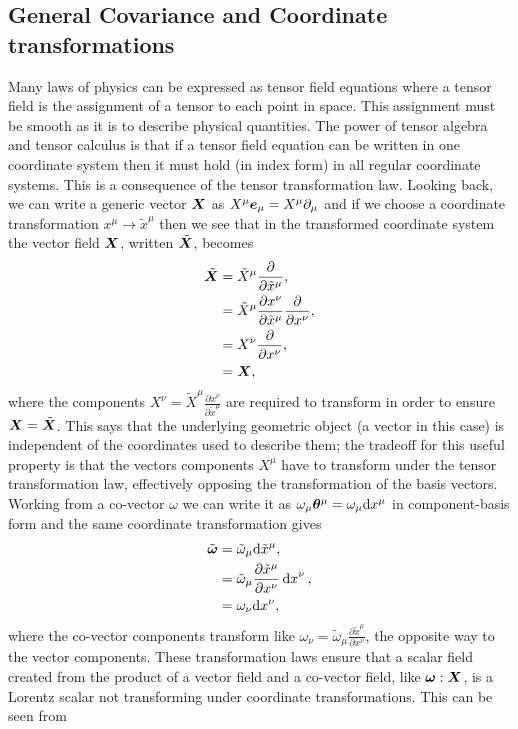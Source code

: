 \subsection{General Covariance and Coordinate transformations}\label{intro:sec:cov}
Many laws of physics can be expressed as tensor field equations where a tensor field is the assignment of a tensor to each point in space. This assignment must be smooth as it is to describe physical quantities. The power of tensor algebra and tensor calculus is that if a tensor field equation can be written in one coordinate system then  it must hold (in index form) in all regular coordinate systems. This is a consequence of the tensor transformation law. Looking back, we can write a generic vector $\boldsymbol{X}$ as $X^\mu \boldsymbol{e}_\mu = X^\mu \partial_\mu$ and if we choose a coordinate transformation $x^\mu \rightarrow \tilde{x}^\mu$ then we see that in the transformed coordinate system the vector field $\boldsymbol{X}$, written $\tilde{\boldsymbol{X}}$, becomes
\begin{align}
\tilde{\boldsymbol X} &= \tilde{X}^\mu\frac{\partial}{\partial \tilde{x}^\mu}, \\
              &= \tilde{X}^\mu\frac{\partial x^\nu}{\partial \tilde{x}^\mu}\frac{\partial}{\partial {x}^\nu}, \\
              &= X^\nu \frac{\partial}{\partial x^\nu}, \\
              &= \boldsymbol{X}, \
\end{align}
where the components $X^\nu = \tilde{X}^\mu\frac{\partial x^\nu}{\partial \tilde{x}^\mu}$ are required to transform in order to ensure $\boldsymbol{X}=\tilde{\boldsymbol{X}}$. This says that the underlying geometric object (a vector in this case) is independent of the coordinates used to describe them; the tradeoff for this useful property is that the vectors components $X^\mu$ have to transform under the tensor transformation law, effectively opposing the transformation of the basis vectors. Working from a co-vector $\omega$ we can write it as $\omega_\mu \boldsymbol{\theta}^\mu = \omega_\mu \dd x^\mu$ in component-basis form and the same coordinate transformation gives
\begin{align}
\tilde{\boldsymbol{\omega}} &= \tilde{\omega}_\mu \dd \tilde{x}^\mu , \\
                    &= \tilde{\omega}_\mu \frac{\partial \tilde{x}^\mu}{\partial x^\nu}\dd {x}^\nu , \\
                    &= \omega_\nu \dd x^\nu,
\end{align}
where the co-vector components transform like $\omega_\nu= \tilde{\omega}_\mu \frac{\partial \tilde{x}^\mu}{\partial x^\nu}$, the opposite way to the vector components. These transformation laws ensure that a scalar field created from the product of a vector field and a co-vector field, like $\boldsymbol{\omega}: \boldsymbol{X}$, is a Lorentz scalar not transforming under coordinate transformations. This can be seen from
